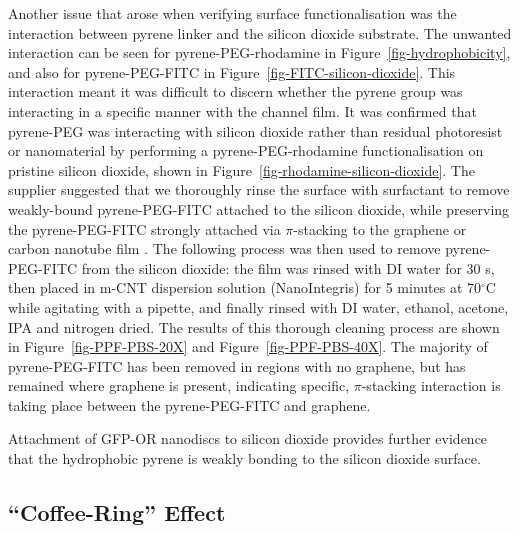 \documentclass[
  a4paper,
]{scrbook}
\begin{document}
Another issue that arose when verifying surface functionalisation was
the interaction between pyrene linker and the silicon dioxide substrate.
The unwanted interaction can be seen for pyrene-PEG-rhodamine in
Figure~\ref{fig-hydrophobicity}, and also for pyrene-PEG-FITC in
Figure~\ref{fig-FITC-silicon-dioxide}. This interaction meant it was
difficult to discern whether the pyrene group was interacting in a
specific manner with the channel film. It was confirmed that pyrene-PEG
was interacting with silicon dioxide rather than residual photoresist or
nanomaterial by performing a pyrene-PEG-rhodamine functionalisation on
pristine silicon dioxide, shown in
Figure~\ref{fig-rhodamine-silicon-dioxide}. The supplier suggested that
we thoroughly rinse the surface with surfactant to remove weakly-bound
pyrene-PEG-FITC attached to the silicon dioxide, while preserving the
pyrene-PEG-FITC strongly attached via \(\pi\)-stacking to the graphene
or carbon nanotube film \autocite{CreativePEGworks2022}. The following
process was then used to remove pyrene-PEG-FITC from the silicon
dioxide: the film was rinsed with DI water for 30 s, then placed in
m-CNT dispersion solution (NanoIntegris) for 5 minutes at 70\(^\circ\)C
while agitating with a pipette, and finally rinsed with DI water,
ethanol, acetone, IPA and nitrogen dried. The results of this thorough
cleaning process are shown in Figure~\ref{fig-PPF-PBS-20X} and
Figure~\ref{fig-PPF-PBS-40X}. The majority of pyrene-PEG-FITC has been
removed in regions with no graphene, but has remained where graphene is
present, indicating specific, \(\pi\)-stacking interaction is taking
place between the pyrene-PEG-FITC and graphene.

Attachment of GFP-OR nanodiscs to silicon dioxide provides further
evidence that the hydrophobic pyrene is weakly bonding to the silicon
dioxide surface.

\hypertarget{sec-coffee-ring}{%
\subsection{``Coffee-Ring'' Effect}\label{sec-coffee-ring}}
\end{document}
